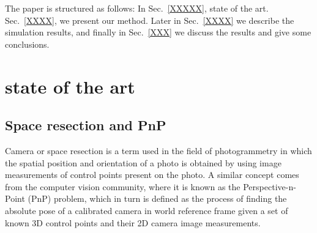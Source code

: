 \documentclass[letterpaper, 10 pt, conference]{ieeeconf}  %
\begin{document}
	
	
	
	
	
	
	The paper is structured as follows:  In Sec.~\ref{XXXXX}, state of the art. Sec.~\ref{XXXX}, we present our method. Later in Sec.~\ref{XXXX} we describe the simulation results, and finally in Sec.~\ref{XXX} we discuss the results and give some conclusions.
	
	\section{state of the art}
	\label{state_of_the_art}
	\subsection{Space resection and PnP}
	Camera or space resection is a term used in the field of photogrammetry in which the spatial position and orientation of a photo is obtained by using image measurements of control points present on the photo. A similar concept comes from the computer vision community, where it is known as the Perspective-n-Point (PnP) problem, which in turn is defined as the process of finding the absolute pose of a calibrated camera in world reference frame given a set of known 3D control points and their 2D camera image measurements.
	
\end{document}
